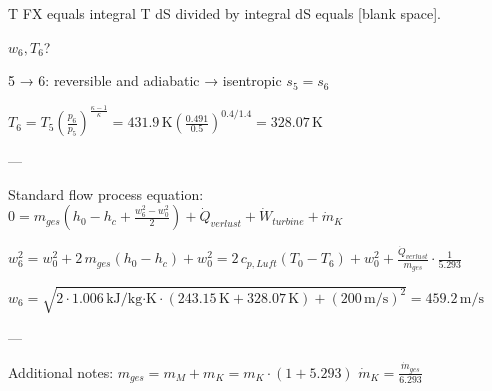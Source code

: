 T FX equals integral T dS divided by integral dS equals [blank space].

\( w_6, T_6 \)?  

5 → 6: reversible and adiabatic → isentropic  
\( s_5 = s_6 \)  

\( T_6 = T_5 \left( \frac{p_6}{p_5} \right)^{\frac{\kappa - 1}{\kappa}} = 431.9 \, \text{K} \left( \frac{0.491}{0.5} \right)^{0.4 / 1.4} = 328.07 \, \text{K} \)  

---

Standard flow process equation:  
\( 0 = m_{ges} \left( h_0 - h_c + \frac{w_6^2 - w_0^2}{2} \right) + \dot{Q}_{verlust} + \dot{W}_{turbine} + \dot{m}_K \)  

\( w_6^2 = w_0^2 + 2 \, m_{ges} \left( h_0 - h_c \right) + w_0^2 = 2 \, c_{p, Luft} \left( T_0 - T_6 \right) + w_0^2 + \frac{\dot{Q}_{verlust}}{m_{ges}} \cdot \frac{1}{5.293} \)  

\( w_6 = \sqrt{2 \cdot 1.006 \, \text{kJ/kg·K} \cdot \left( 243.15 \, \text{K} + 328.07 \, \text{K} \right) + \left( 200 \, \text{m/s} \right)^2} = 459.2 \, \text{m/s} \)  

---

Additional notes:  
\( m_{ges} = m_M + m_K = m_K \cdot (1 + 5.293) \)  
\( \dot{m}_K = \frac{\dot{m}_{ges}}{6.293} \)